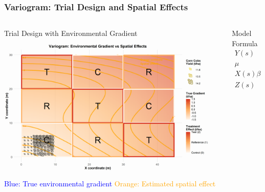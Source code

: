 \begin{frame}
    \frametitle{Variogram: Trial Design and Spatial Effects}
    \begin{columns}[T]
        \begin{column}{0.55\textwidth}
            \begin{block}{Trial Design with Environmental Gradient}
                \centering
                \includegraphics[width=0.95\textwidth]{Imgs/variogram_trial_design_spatial.png}
                \vspace{0.5em}
                \scriptsize
                \textcolor{blue}{Blue: True environmental gradient}
                \textcolor{orange}{Orange: Estimated spatial effect}
            \end{block}
        \end{column}
        \begin{column}{0.45\textwidth}
            \begin{block}{Model Formula}
                \vspace{0.5em}
                \begin{align*}
                    Y(s) &= \mu + X(s)\beta + Z(s) \\
                    \mu &: \text{Overall mean} \\
                    X(s)\beta &: \text{Treatment effect} \\
                    Z(s) &: \text{Spatial effect (covariance)}
                \end{align*}
            \end{block}
        \end{column}
    \end{columns}
\end{frame}

